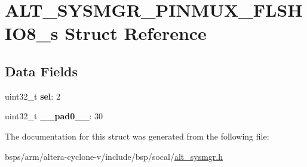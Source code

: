 \hypertarget{structALT__SYSMGR__PINMUX__FLSHIO8__s}{}\section{A\+L\+T\+\_\+\+S\+Y\+S\+M\+G\+R\+\_\+\+P\+I\+N\+M\+U\+X\+\_\+\+F\+L\+S\+H\+I\+O8\+\_\+s Struct Reference}
\label{structALT__SYSMGR__PINMUX__FLSHIO8__s}
\subsection*{Data Fields}
\begin{DoxyCompactItemize}
\item 
\mbox{\label{structALT__SYSMGR__PINMUX__FLSHIO8__s_a3e1ae4ed1b8909fa8d9ef9ed6c066918}} 
uint32\+\_\+t {\bfseries sel}\+: 2
\item 
\mbox{\label{structALT__SYSMGR__PINMUX__FLSHIO8__s_a944eacd7bfc08cc75a4a1176e1b6904c}} 
uint32\+\_\+t {\bfseries \+\_\+\+\_\+pad0\+\_\+\+\_\+}\+: 30
\end{DoxyCompactItemize}


The documentation for this struct was generated from the following file\+:\begin{DoxyCompactItemize}
\item 
bsps/arm/altera-\/cyclone-\/v/include/bsp/socal/\mbox{\hyperlink{alt__sysmgr_8h}{alt\+\_\+sysmgr.\+h}}\end{DoxyCompactItemize}
